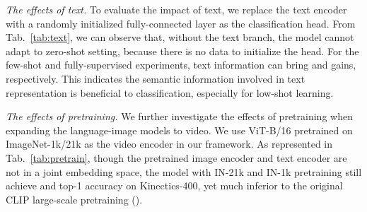\documentclass[runningheads]{llncs}
\begin{document}
\textit{The effects of text.} To evaluate the impact of text, we replace the text encoder with a randomly initialized fully-connected layer as the classification head. From Tab.~\ref{tab:text}, we can observe that, without the text branch, the model cannot adapt to zero-shot setting, because there is no data to initialize the head. For the few-shot and fully-supervised experiments, text information can bring  and  gains, respectively. This indicates the semantic information involved in text representation is beneficial to classification, especially for low-shot learning.

\textit{The effects of pretraining.} We further investigate the effects of pretraining when expanding the language-image models to video. We use ViT-B/16 pretrained on ImageNet-1k/21k as the video encoder in our framework. As represented in Tab.~\ref{tab:pretrain}, though the pretrained image encoder and text encoder are not in a joint embedding space, the model with IN-21k and IN-1k pretraining still achieve  and  top-1 accuracy on Kinectics-400, yet much inferior to the original CLIP large-scale pretraining ().
\end{document}
